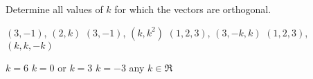 
\begin{Exercise}[
name={},
title={}, 
difficulty=0,
origin={\cite{SM}}]
Determine all values of $k$ for which the vectors are orthogonal.
\begin{multicols}{2}
\Question $(3,-1)$, $(2,k)$
\Question $(3,-1)$, $(k,k^2)$
\Question $(1,2,3)$, $(3,-k,k)$
\Question $(1,2,3)$, $(k,k,-k)$
\EndCurrentQuestion
\end{multicols}
\end{Exercise}

\begin{Answer}
\begin{multicols}{2}
\Question $k=6$
\Question $k=0$ or $k=3$
\Question $k=-3$
\Question any $k\in\Re$
\EndCurrentQuestion
\end{multicols}
\end{Answer}
